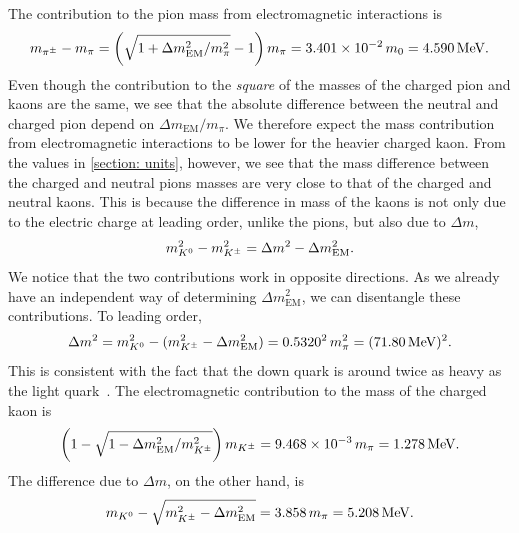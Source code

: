The contribution to the pion mass from electromagnetic interactions is
%
\begin{equation}
    m_{\pi^\pm} - m_\pi = \left(\sqrt{1 + \Delta m_\text{EM}^2 / m_\pi^2} - 1\right) m_\pi
    = 3.401\times 10^{-2} \,m_0 = 4.590\,\text{MeV}.
\end{equation}
%
Even though the contribution to the \emph{square} of the masses of the charged pion and kaons are the same, we see that the absolute difference between the neutral and charged pion depend on $\Delta m_\text{EM}/ m_\pi $.
We therefore expect the mass contribution from electromagnetic interactions to be lower for the heavier charged kaon.
From the values in \autoref{section: units}, however, we see that the mass difference between the charged and neutral pions masses are very close to that of the charged and neutral kaons.
This is because the difference in mass of the kaons is not only due to the electric charge at leading order, unlike the pions, but also due to $\Delta m$,
%
\begin{equation}
    m_{K^0}^2 - m_{K^\pm}^2 = \Delta m^2 - \Delta m_\text{EM}^2.
\end{equation}
%
We notice that the two contributions work in opposite directions.
As we already have an independent way of determining $\Delta m_\text{EM}^2$, we can disentangle these contributions.
To leading order,
%
\begin{equation}
    \Delta m^2 
    = { m_{K^0}^2 - (m_{K^\pm}^2 - \Delta m^2_\text{EM})}
    = 0.5320^2 \, m_\pi^2 = (71.80\, \text{MeV})^2.
\end{equation}
%
This is consistent with the fact that the down quark is around twice as heavy as the light quark~\autocite{particledatagroupReviewParticlePhysics2020}.
The electromagnetic contribution to the mass of the charged kaon is
%
\begin{equation}
    \left(1 - \sqrt{1 - \Delta m_\text{EM}^2/m_{K^\pm}^2} \right) m_{K^\pm}
    = 9.468 \times 10^{-3} \, m_\pi = 1.278 \, \text{MeV}.
\end{equation}
%
The difference due to $\Delta m$, on the other hand, is
%
\begin{equation}
    m_{K^0} - \sqrt{m_{K^\pm}^2 - \Delta m_\text{EM}^2}
    = 3.858\,m_\pi = 5.208\, \text{MeV}.
\end{equation}

